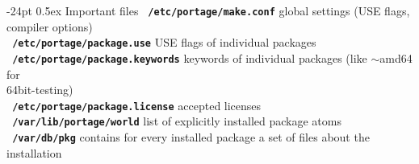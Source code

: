 \documentclass[landscape]{article}
\makeatletter
\renewcommand\section{\@startsection{section}{1}{0mm}%
                                     {-24pt}%
                                     {0.5ex}%
                                {\color{black}\normalfont\large\bfseries}}
\newcommand{\code}{\texttt}
\newcommand{\bcode}[1]{\texttt{\textbf{\color{blue} #1}}}
\makeatother
\begin{document}
\begin{multicols*}{2}
\section{Important files}
\bcode{/etc/portage/make.conf} global settings (USE flags, compiler options)\\
\bcode{/etc/portage/package.use} USE flags of individual packages\\
\bcode{/etc/portage/package.keywords} keywords of individual packages (like $\sim$amd64 for\\ 64bit-testing)\\
\bcode{/etc/portage/package.license} accepted licenses\\
\bcode{/var/lib/portage/world} list of explicitly installed package atoms\\
\bcode{/var/db/pkg} contains for every installed package a set of files about the installation

\end{multicols*}
\end{document}
